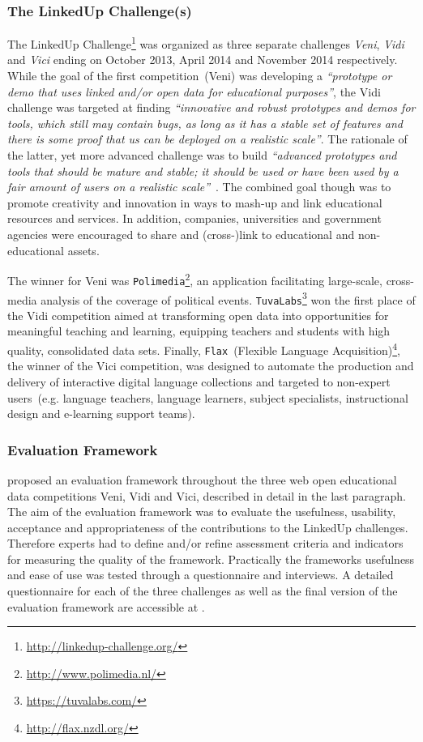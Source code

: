 \subsubsection{The LinkedUp Challenge(s)}
The LinkedUp Challenge\footnote{\url{http://linkedup-challenge.org/}} was organized as three separate challenges \textit{Veni}, \textit{Vidi} and \textit{Vici} ending on October 2013, April 2014 and November 2014 respectively. While the goal of the first competition~(Veni) was developing a \textit{``prototype or demo that uses linked and/or open data for educational purposes''}, the Vidi challenge was targeted at finding \textit{``innovative and robust prototypes and demos for tools, which still may contain bugs, as long as it has a stable set of features and there is some proof that us can be deployed on a realistic scale''}. The rationale of the latter, yet more advanced challenge was to build \textit{``advanced prototypes and tools that should be mature and stable; it should be used or have been used by a fair amount of users on a realistic scale''}~\cite{url:linkedup_lnikedup_challenge_results}. 
The combined goal though was to promote creativity and innovation in ways to mash-up and link educational resources and services. In addition, companies, universities and government agencies were encouraged to share and (cross-)link to educational and non-educational assets. 

The winner for Veni was \texttt{Polimedia}\footnote{\url{http://www.polimedia.nl/}}, an application facilitating large-scale, cross-media analysis of the coverage of political events.
\texttt{TuvaLabs}\footnote{\url{https://tuvalabs.com/}} won the first place of the Vidi competition aimed at transforming open data into opportunities for meaningful teaching and learning, equipping teachers and students with high quality, consolidated data sets. Finally, \texttt{Flax}~(Flexible Language Acquisition)\footnote{\url{http://flax.nzdl.org/}}, the winner of the Vici competition, was designed to automate the production and delivery of interactive digital language collections and targeted to non-expert users~(e.g. language teachers, language learners, subject specialists, instructional design and e-learning support teams). 

\subsubsection{Evaluation Framework}
\citet{url:linkedup_evaluation_framework} proposed an evaluation framework throughout the three web open educational data competitions Veni, Vidi and Vici, described in detail in the last paragraph. The aim of the evaluation framework was to evaluate the usefulness, usability, acceptance and appropriateness of the contributions to the LinkedUp challenges. Therefore experts had to define and/or refine assessment criteria and indicators for measuring the quality of the framework. Practically the frameworks usefulness and ease of use was tested through a questionnaire and interviews. A detailed questionnaire for each of the three challenges as well as the final version of the evaluation framework are accessible at \cite{url:linkedup_evaluation_framework}.

